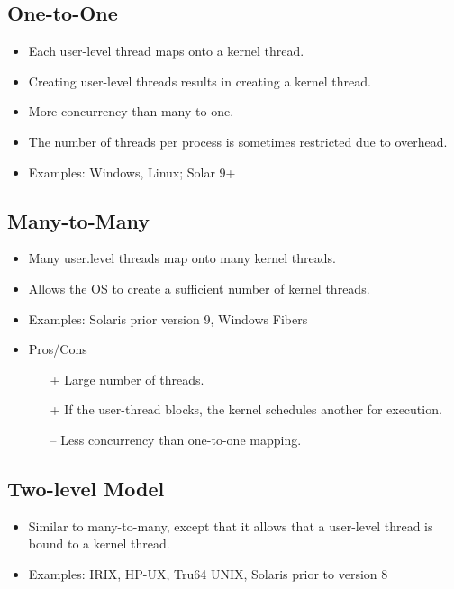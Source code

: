         \subsection{One-to-One}
            \begin{itemize}
            	\item Each user-level thread maps onto a kernel thread.
            	\item Creating user-level threads results in creating a kernel thread.
            	\item More concurrency than many-to-one.
            	\item The number of threads per process is sometimes restricted due to overhead.
            	\item Examples: Windows, Linux; Solar 9+
            \end{itemize}

        \subsection{Many-to-Many}
            \begin{itemize}
            	\item Many user.level threads map onto many kernel threads.
            	\item Allows the OS to create a sufficient number of kernel threads.
            	\item Examples: Solaris prior version 9, Windows Fibers
            	\item Pros/Cons
                	\begin{itemize}
                		\item[+] Large number of threads.
                		\item[+] If the user-thread blocks, the kernel schedules another for execution.
                		\item[--] Less concurrency than one-to-one mapping.
                	\end{itemize}
            \end{itemize}

        \subsection{Two-level Model}
            \begin{itemize}
            	\item Similar to many-to-many, except that it allows that a user-level thread is bound to a kernel thread.
            	\item Examples: IRIX, HP-UX, Tru64 UNIX, Solaris prior to version 8
            \end{itemize}

